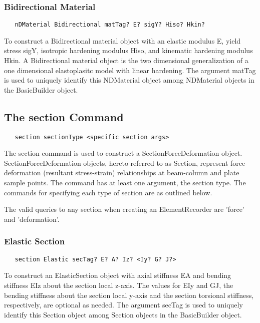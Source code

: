 \documentclass[12pt]{article}
\begin{document}
\subsubsection{Bidirectional Material}
{\sf\small
\begin{verbatim}
   nDMaterial Bidirectional matTag? E? sigY? Hiso? Hkin?
\end{verbatim}
}

To construct a Bidirectional material object with an elastic modulus
E, yield stress sigY, isotropic hardening modulus Hiso, and kinematic
hardening modulus Hkin. A Bidirectional material object is the two
dimensional generalization of a one dimensional elastoplasitc model
with linear hardening.
The argument matTag is used to
uniquely identify this NDMaterial object among NDMaterial objects
in the BasicBuilder object.

\subsection{The section Command}
{\sf\small
\begin{verbatim}
   section sectionType <specific section args>
\end{verbatim}
}

The section command is used to construct a SectionForceDeformation object.
SectionForceDeformation objects, hereto referred to as Section, represent force-deformation
(resultant stress-strain) relationships at beam-column and plate sample points. The
command has at least one argument, the section type. The
commands for specifying each type of section are as outlined below.

The valid queries to any section when creating an ElementRecorder
are 'force' and 'deformation'.

\subsubsection{Elastic Section}
{\sf\small
\begin{verbatim}
   section Elastic secTag? E? A? Iz? <Iy? G? J?>
\end{verbatim}
}

To construct an ElasticSection object with axial stiffness EA and 
bending stiffness EIz about the section local z-axis. The values 
for EIy and GJ, the bending stiffness about the section local
y-axis and the section torsional stiffness, respectively, are optional
as needed. The argument secTag is used to uniquely identify this 
Section object among Section objects in the BasicBuilder object.
\end{document}
